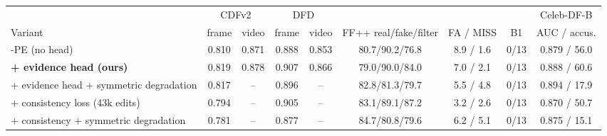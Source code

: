 \begin{tabular}{lcccccccc}
\toprule
 & \multicolumn{2}{c}{CDFv2} & \multicolumn{2}{c}{DFD} & & & & Celeb-DF-B \\
\cmidrule(lr){2-3}\cmidrule(lr){4-5}
Variant & frame & video & frame & video & FF++ real/fake/filter & FA / MISS & B1 & AUC / accus. \\
\midrule
\ours{}-PE (no head) & 0.810 & 0.871 & 0.888 & 0.853 & 80.7/90.2/76.8 & 8.9 / 1.6 & 0/13 & 0.879 / 56.0 \\
\textbf{+ evidence head (ours)} & 0.819 & 0.878 & 0.907 & 0.866 & 79.0/90.0/84.0 & 7.0 / 2.1 & 0/13 & 0.888 / 60.6 \\
+ evidence head + symmetric degradation & 0.817 & -- & 0.896 & -- & 82.8/81.3/79.7 & 5.5 / 4.8 & 0/13 & 0.894 / 17.9 \\
+ consistency loss (43k edits) & 0.794 & -- & 0.905 & -- & 83.1/89.1/87.2 & 3.2 / 2.6 & 0/13 & 0.870 / 50.7 \\
+ consistency + symmetric degradation & 0.781 & -- & 0.877 & -- & 84.7/80.8/79.6 & 6.2 / 5.1 & 0/13 & 0.875 / 15.1 \\
\bottomrule
\end{tabular}
